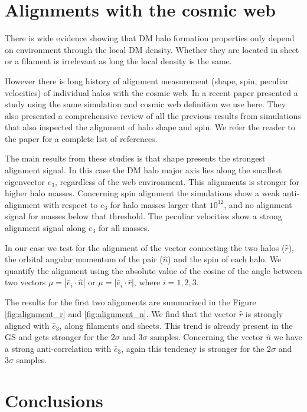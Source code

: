 \documentclass{iau}
\newcommand{\Msun}{{\ifmmode{{\rm {M_{\odot}}}}\else{${\rm{M_{\odot}}}$}\fi}}
\begin{document}
\section{Alignments with the cosmic web}

There is wide evidence showing that DM halo formation properties only
depend on environment through the local DM density. Whether they are
located in sheet or a filament is irrelevant as long the local density
is the same. 

However there is long history of alignment measurement (shape, spin,
peculiar velocities) of individual halos with the cosmic web. In a
recent paper \cite{ForeroRomero2014} presented a study
using the same simulation and cosmic web definition we use here.
They also presented a comprehensive review of all the previous results
from simulations that also inspected the alignment of halo shape and
spin. We refer the reader to the paper for a complete list of
references. 

The main results from these studies is that shape presents the
strongest alignment signal. In this case the DM halo major axis lies
along the smallest eigenvector $e_{3}$, regardless of the web
environment. This alignments is stronger for higher halo
masses. Concerning spin alignment the simulations show a weak
anti-alignment with respect to $e_{3}$ for halo masses larger that
$10^{12}$\Msun, and no alignment signal for masses below that
threshold. The peculiar velocities show a strong alignment signal
along $e_{3}$ for all masses.


In our case we test for the alignment of the vector connecting the two
halos ($\hat{r}$), the orbital angular momentum of the pair
($\hat{n}$) and the spin of each
halo. We quantify the alignment using the absolute value of the cosine of
the angle between two vectors $\mu=|\hat{e}_i \cdot \hat{n}|$ or
$\mu=|\hat{e}_i\cdot \hat{r}|$, where $i=1,2,3$.  

The results for the first two alignments are summarized in the Figure
\ref{fig:alignment_r} and \ref{fig:alignment_n}.  We find that the
vector $\hat{r}$ is strongly aligned with $\hat{e}_{3}$, along
filaments and sheets. This trend is already present in the GS and gets
stronger for the $2\sigma$ and $3\sigma$ samples. Concerning the
vector $\hat{n}$ we have a strong anti-correlation  with $\hat{e}_3$,
again this tendency is stronger for the $2\sigma$ and $3\sigma$
samples. 


\section{Conclusions}
\end{document}

